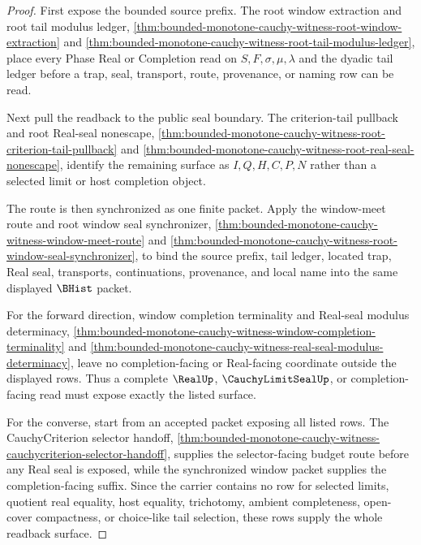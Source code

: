 \begin{proof}
First expose the bounded source prefix. The root window extraction and root tail modulus ledger, \autoref{thm:bounded-monotone-cauchy-witness-root-window-extraction} and \autoref{thm:bounded-monotone-cauchy-witness-root-tail-modulus-ledger}, place every Phase Real or Completion read on $S,F,\sigma,\mu,\lambda$ and the dyadic tail ledger before a trap, seal, transport, route, provenance, or naming row can be read.

Next pull the readback to the public seal boundary. The criterion-tail pullback and root Real-seal nonescape, \autoref{thm:bounded-monotone-cauchy-witness-root-criterion-tail-pullback} and \autoref{thm:bounded-monotone-cauchy-witness-root-real-seal-nonescape}, identify the remaining surface as $I,Q,H,C,P,N$ rather than a selected limit or host completion object.

The route is then synchronized as one finite packet. Apply the window-meet route and root window seal synchronizer, \autoref{thm:bounded-monotone-cauchy-witness-window-meet-route} and \autoref{thm:bounded-monotone-cauchy-witness-root-window-seal-synchronizer}, to bind the source prefix, tail ledger, located trap, Real seal, transports, continuations, provenance, and local name into the same displayed $\BHist$ packet.

For the forward direction, window completion terminality and Real-seal modulus determinacy, \autoref{thm:bounded-monotone-cauchy-witness-window-completion-terminality} and \autoref{thm:bounded-monotone-cauchy-witness-real-seal-modulus-determinacy}, leave no completion-facing or Real-facing coordinate outside the displayed rows. Thus a complete $\RealUp$, $\CauchyLimitSealUp$, or completion-facing read must expose exactly the listed surface.

For the converse, start from an accepted packet exposing all listed rows. The CauchyCriterion selector handoff, \autoref{thm:bounded-monotone-cauchy-witness-cauchycriterion-selector-handoff}, supplies the selector-facing budget route before any Real seal is exposed, while the synchronized window packet supplies the completion-facing suffix. Since the carrier contains no row for selected limits, quotient real equality, host equality, trichotomy, ambient completeness, open-cover compactness, or choice-like tail selection, these rows supply the whole readback surface.
\end{proof}

